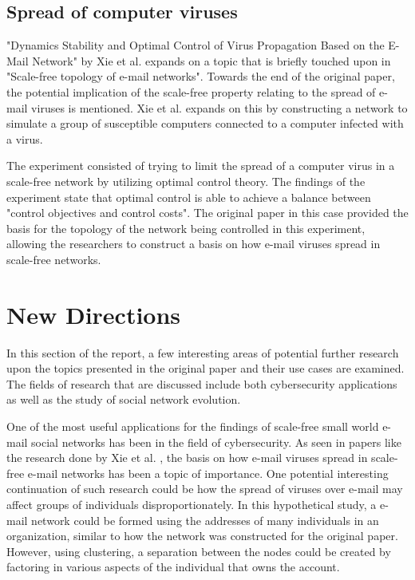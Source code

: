 \documentclass[11pt]{article}
\begin{document}
\begin{multicols}{2}
\subsection{Spread of computer viruses}
\hspace*{\parindent}"Dynamics Stability and Optimal Control of Virus Propagation Based on the E-Mail Network" by Xie et al. \cite{5} expands on a topic that is briefly touched upon in "Scale-free topology of e-mail networks". Towards the end of the original paper, the potential implication of the scale-free property relating to the spread of e-mail viruses is mentioned. Xie et al. expands on this by constructing a network to simulate a group of susceptible computers connected to a computer infected with a virus. 

The experiment consisted of trying to limit the spread of a computer virus in a scale-free network by utilizing optimal control theory. The findings of the experiment state that optimal control is able to achieve a balance between "control objectives and control costs". The original paper in this case provided the basis for the topology of the network being controlled in this experiment, allowing the researchers to construct a basis on how e-mail viruses spread in scale-free networks. 


\section{New Directions}
\hspace*{\parindent}In this section of the report, a few interesting areas of potential further research upon the topics presented in the original paper and their use cases are examined. The fields of research that are discussed include both cybersecurity applications as well as the study of social network evolution.

One of the most useful applications for the findings of scale-free small world e-mail social networks has been in the field of cybersecurity. As seen in papers like the research done by Xie et al. \cite{5}, the basis on how e-mail viruses spread in scale-free e-mail networks has been a topic of importance. One potential interesting continuation of such research could be how the spread of viruses over e-mail may affect groups of individuals disproportionately. In this hypothetical study, a e-mail network could be formed using the addresses of many individuals in an organization, similar to how the network was constructed for the original paper. However, using clustering, a separation between the nodes could be created by factoring in various aspects of the individual that owns the account. 


\end{multicols}
\end{document}
